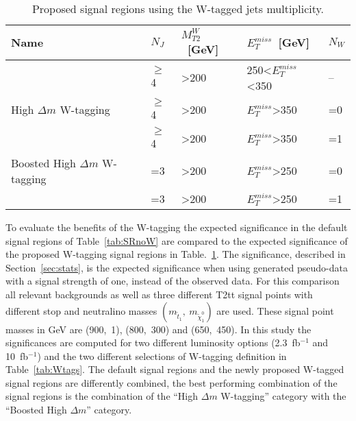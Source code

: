 \begin{table}[h]
\begin{center}
\begin{tabular}{|l|l|l|l|l|}
\hline
Name            & $N_{J}$  & $M_{T2}^{W}$~[GeV]            & $E_{T}^{miss}$~[GeV]    & $N_{W}$ \\
\hline
\hline
                          & $\geq$4  & >200                & 250<$E_{T}^{miss}$<350   & --   \\
High $\Delta m$ W-tagging & $\geq$4  & >200                & $E_{T}^{miss}$>350       & =0    \\
                          & $\geq$4  & >200                & $E_{T}^{miss}$>350       & =1    \\
\hline
Boosted High $\Delta m$ W-tagging & =3  & >200              & $E_{T}^{miss}$>250 & =0  \\
                                  & =3  & >200              & $E_{T}^{miss}$>250 & =1  \\
\hline
\end{tabular}
\caption[Table caption text]{ Proposed signal regions using the W-tagged jets multiplicity. }
\label{tab:SRW}
\end{center}
\end{table}

To evaluate the benefits of the W-tagging the expected significance in the default signal regions of Table~\ref{tab:SRnoW} are compared to the expected significance of the proposed W-tagging signal regions in Table.~\ref{tab:SRW}. The significance, described in Section~\ref{sec:stats}, is the expected significance when using generated pseudo-data with a signal strength of one, instead of the observed data. For this comparison all relevant backgrounds as well as three different T2tt signal points with different stop and neutralino masses $(m_{\tilde{t}_{1}},~m_{\tilde{\chi}^{0}_{1}})$ are used. These signal point masses in GeV are (900,~1), (800,~300) and (650,~450). In this study the significances are computed for two different luminosity options (2.3~fb$^{-1}$ and 10~fb$^{-1}$) and the two different selections of W-tagging definition in Table~\ref{tab:Wtags}. The default signal regions and the newly proposed W-tagged signal regions are differently combined, the best performing combination of the signal regions is  the combination of the ``High $\Delta m$ W-tagging'' category with the ``Boosted High $\Delta m$'' category.


